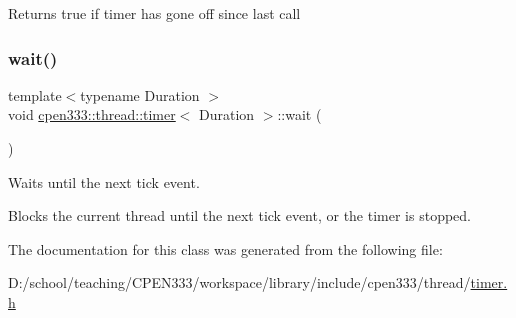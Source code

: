 \begin{DoxyReturn}{Returns}
true if timer has gone off since last call 
\end{DoxyReturn}
\mbox{\label{classcpen333_1_1thread_1_1timer_aecbb193d8d58a41488881fd795aac9e1}} 
\subsubsection{\texorpdfstring{wait()}{wait()}}
{\footnotesize\ttfamily template$<$typename Duration $>$ \\
void \hyperlink{classcpen333_1_1thread_1_1timer}{cpen333\+::thread\+::timer}$<$ Duration $>$\+::wait (\begin{DoxyParamCaption}{ }\end{DoxyParamCaption})\hspace{0.3cm}{\ttfamily [inline]}}



Waits until the next tick event. 

Blocks the current thread until the next tick event, or the timer is stopped. 

The documentation for this class was generated from the following file\+:\begin{DoxyCompactItemize}
\item 
D\+:/school/teaching/\+C\+P\+E\+N333/workspace/library/include/cpen333/thread/\hyperlink{timer_8h}{timer.\+h}\end{DoxyCompactItemize}
